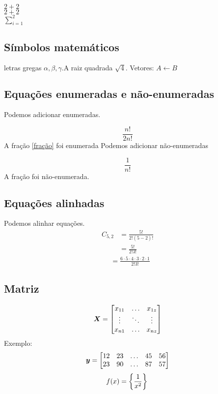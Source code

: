 \documentclass[12pt]{article} %
\newcommand{\mat}[1]{\mbox{\boldmath{$#1$}}}
\begin{document}
\( 2+2 \)\\

\begin{math}
2+2
\end{math}\\

\begin{math}
\sum_{i=1}^2
\end{math}
\subsection{Símbolos matemáticos}
letras gregas  $\alpha, \beta,\gamma$.A raiz quadrada $\sqrt{4}$. Vetores: $A\longleftarrow B$
\subsection{Equações enumeradas e não-enumeradas}
Podemos adicionar enumeradas.

\begin{equation}
    \frac{n!}{2n!}
    \label{fração}
\end{equation}
A fração \ref{fração} foi enumerada 
Podemos adicionar não-enumeradas

\begin{equation*}
    \frac{1}{n!}
    \label{fraçãonãoenumeradas}
\end{equation*}
A fração  foi não-enumerada.
\subsection{Equações alinhadas}
Podemos alinhar equações.
\begin{align}
    C_{5,2} &= \frac{5!}{2!(5-2)!}\\
            &=  \frac{5!}{2!3!}
\end{align}
\begin{align*}
    &=\frac{6\cdot5\cdot4\cdot3\cdot2\cdot1}{2!3!}
\end{align*}
\subsection{Matriz}
\begin{equation}
\mat{X} =
       \begin{bmatrix}
       x_{11} & \hdots & x_{1z}\\
       \vdots & \ddots & \vdots\\
       x_{n1} & \hdots & x_{nz}
       \end{bmatrix}
\end{equation}
Exemplo:
\begin{equation*}
\mat{y} =
       \begin{bmatrix}
       12 & 23 & \hdots & 45 & 56\\
       23 & 90 & \hdots & 87 & 57\\
       \end{bmatrix}
\end{equation*}
\begin{equation}
    f(x) =  \left \{ \frac{1}{x^2} \right \}\\
\end{equation}
\end{document}
